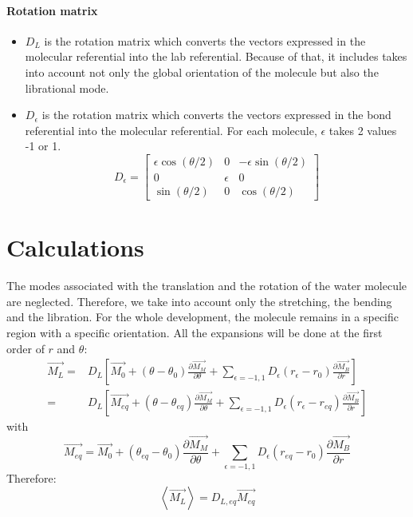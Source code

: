 \documentclass[12pt,a4paper]{article}
\newcommand{\ML}{\overrightarrow{M_L}}
\newcommand{\MM}{\overrightarrow{M_M}}
\newcommand{\MB}{\overrightarrow{M_B}}
\newcommand{\MO}{\overrightarrow{M_0}}
\newcommand{\ME}{\overrightarrow{M_{eq}}}
\newcommand{\DE}{D_{L,eq}}
\newcommand{\dmdtheta}{\frac{\partial \MM}{\partial \theta}}
\newcommand{\dmdr}{\frac{\partial \MB}{\partial r}}
\begin{document}
\paragraph{Rotation matrix}
\begin{itemize}
\item $D_L$ is the rotation matrix which converts the vectors expressed in the molecular referential into the lab referential. Because of that, it includes takes into account not only the global orientation of the molecule but also the librational mode.
\item $D_\epsilon$ is the rotation matrix which converts the vectors expressed in the bond referential into the molecular referential. For each molecule, $\epsilon$ takes 2 values -1 or 1.
  \begin{equation}
    D_\epsilon = \begin{bmatrix}
        \epsilon \cos(\theta/2) & 0  & -\epsilon \sin(\theta/2)\\
        0 & \epsilon & 0 \\
        \sin(\theta/2) & 0 & \cos(\theta/2)
      \end{bmatrix}
  \end{equation}
  
\end{itemize}



\section{Calculations}
The modes associated with the translation and the rotation of the water molecule are neglected. Therefore, we take into account only the stretching, the bending and the libration. For the whole development, the molecule remains in a specific region with a specific orientation. All the expansions will be done at the first order of $r$ and $\theta$:
\begin{align}
  \ML=& D_L \left[ \MO +
    \left( \theta -\theta_0 \right) \dmdtheta +
    \sum_{\epsilon=-1,1} D_\epsilon\left( r_\epsilon-r_0 \right) \dmdr
  \right]\\
  = & D_L \left[ \ME +
    \left( \theta -\theta_{eq} \right) \dmdtheta +
    \sum_{\epsilon=-1,1} D_\epsilon\left( r_\epsilon-r_{eq} \right) \dmdr
  \right]
\end{align}
with 
\begin{equation}
  \ME = \MO + 
  \left( \theta_{eq} -\theta_0 \right) \dmdtheta +
  \sum_{\epsilon=-1,1} D_\epsilon\left( r_{eq}-r_0 \right) \dmdr
\end{equation}
Therefore:
\begin{equation}
  \left\langle \ML \right\rangle = \DE\ME
\end{equation}
\end{document}
